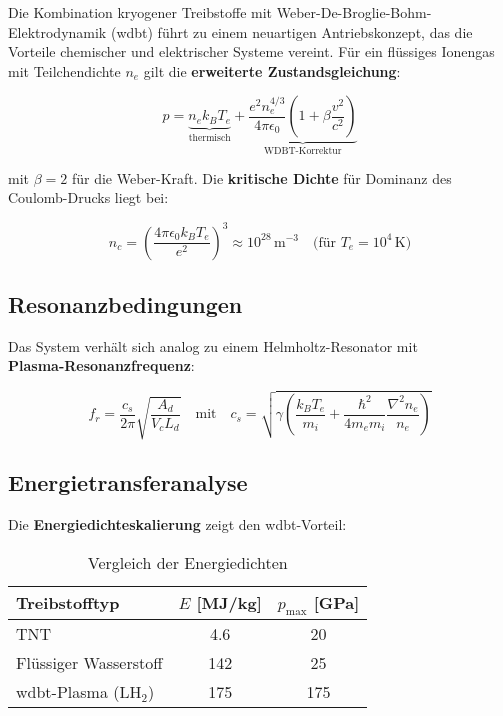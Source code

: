 Die Kombination kryogener Treibstoffe mit Weber-De-Broglie-Bohm-Elektrodynamik (\gls{wdbt}) führt zu einem neuartigen Antriebskonzept, das die Vorteile chemischer und elektrischer Systeme vereint.
Für ein flüssiges Ionengas mit Teilchendichte $n_e$ gilt die \textbf{erweiterte Zustandsgleichung}:

\begin{equation}
p = \underbrace{n_e k_B T_e}_{\text{thermisch}} 
+ \underbrace{\frac{e^2 n_e^{4/3}}{4\pi \epsilon_0} \left(1 + \beta \frac{v^2}{c^2}\right)}_{\text{WDBT-Korrektur}}
\label{eq:druck}
\end{equation}

mit $\beta = 2$ für die Weber-Kraft. Die \textbf{kritische Dichte} für Dominanz des Coulomb-Drucks liegt bei:

\begin{equation}
n_c = \left(\frac{4\pi \epsilon_0 k_B T_e}{e^2}\right)^3 \approx 10^{28}\,\text{m}^{-3}\quad\text{(für }T_e=10^4\,\text{K)}
\end{equation}

\subsection{Resonanzbedingungen}
\label{subsec:resonanz}

Das System verhält sich analog zu einem Helmholtz-Resonator mit\\\textbf{Plasma-Resonanzfrequenz}:

\begin{equation}
f_r = \frac{c_s}{2\pi}\sqrt{\frac{A_d}{V_c L_d}} \quad \text{mit} \quad c_s = \sqrt{\gamma \left(\frac{k_B T_e}{m_i} + \frac{\hbar^2}{4m_e m_i}\frac{\nabla^2 n_e}{n_e}\right)}
\label{eq:resonanz}
\end{equation}

\subsection{Energietransferanalyse}
\label{subsec:energie}

Die \textbf{Energiedichteskalierung} zeigt den \gls{wdbt}-Vorteil:

\begin{table}[h]
\centering
\caption{Vergleich der Energiedichten}
\label{tab:energie}
\begin{tabular}{lcc}
\toprule
Treibstofftyp & $E$ [MJ/kg] & $p_{\text{max}}$ [GPa] \\
\midrule
TNT & 4.6 & 20 \\
Flüssiger Wasserstoff & 142 & 25 \\
\gls{wdbt}-Plasma (LH$_2$) & 175 & 175 \\
\bottomrule
\end{tabular}
\end{table}

